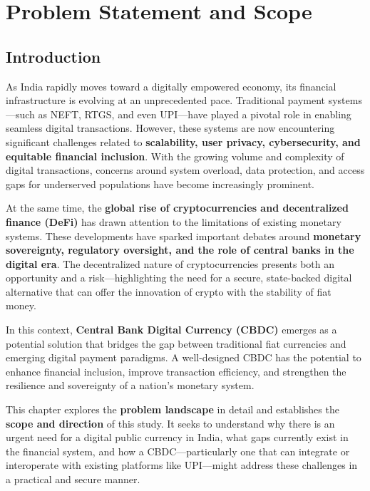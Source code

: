%
\chapter{Problem Statement and Scope}
\label{chp3}

\section{Introduction}
\label{chp3.introduction}

As India rapidly moves toward a digitally empowered economy, its financial infrastructure is evolving at an unprecedented pace. Traditional payment systems—such as NEFT, RTGS, and even UPI—have played a pivotal role in enabling seamless digital transactions. However, these systems are now encountering significant challenges related to \textbf{scalability, user privacy, cybersecurity, and equitable financial inclusion}. With the growing volume and complexity of digital transactions, concerns around system overload, data protection, and access gaps for underserved populations have become increasingly prominent.

At the same time, the \textbf{global rise of cryptocurrencies and decentralized finance (DeFi)} has drawn attention to the limitations of existing monetary systems. These developments have sparked important debates around \textbf{monetary sovereignty, regulatory oversight, and the role of central banks in the digital era}. The decentralized nature of cryptocurrencies presents both an opportunity and a risk—highlighting the need for a secure, state-backed digital alternative that can offer the innovation of crypto with the stability of fiat money.

In this context, \textbf{Central Bank Digital Currency (CBDC)} emerges as a potential solution that bridges the gap between traditional fiat currencies and emerging digital payment paradigms. A well-designed CBDC has the potential to enhance financial inclusion, improve transaction efficiency, and strengthen the resilience and sovereignty of a nation’s monetary system.

This chapter explores the \textbf{problem landscape} in detail and establishes the \textbf{scope and direction} of this study. It seeks to understand why there is an urgent need for a digital public currency in India, what gaps currently exist in the financial system, and how a CBDC—particularly one that can integrate or interoperate with existing platforms like UPI—might address these challenges in a practical and secure manner.

